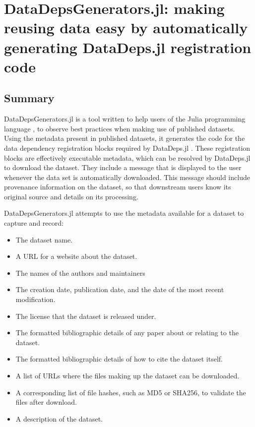 \documentclass{book}
\begin{document}
\chapter{DataDepsGenerators.jl: making reusing data easy by automatically generating DataDeps.jl registration code}


\section{Summary}

DataDepsGenerators.jl is a tool written to help users of the Julia
programming language \citep{Julia}, to observe best practices when
making use of published datasets. Using the metadata present in
published datasets, it generates the code for the data dependency
registration blocks required by DataDeps.jl
\citep{2018arXiv180801091W}. These registration blocks are effectively
executable metadata, which can be resolved by DataDeps.jl to download
the dataset. They include a message that is displayed to the user
whenever the data set is automatically downloaded. This message should
include provenance information on the dataset, so that downstream users
know its original source and details on its processing.

DataDepsGenerators.jl attempts to use the metadata available for a
dataset to capture and record:

\begin{itemize}
	
	\item
	The dataset name.
	\item
	A URL for a website about the dataset.
	\item
	The names of the authors and maintainers
	\item
	The creation date, publication date, and the date of the most recent
	modification.
	\item
	The license that the dataset is released under.
	\item
	The formatted bibliographic details of any paper about or relating to
	the dataset.
	\item
	The formatted bibliographic details of how to cite the dataset itself.
	\item
	A list of URLs where the files making up the dataset can be
	downloaded.
	\item
	A corresponding list of file hashes, such as MD5 or SHA256, to
	validate the files after download.
	\item
	A description of the dataset.
\end{itemize}
\end{document}
